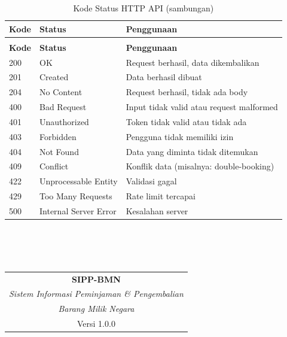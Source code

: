 \documentclass[
  12pt,
  a4paper,
  oneside,
  final
]{report}
\begin{document}
\begin{longtable}[!htbp]{p{3cm} p{4cm} p{5.5cm}}
  \caption{Kode Status HTTP API}
  \label{tab:http-status} \\
  \toprule
  \textbf{Kode} & \textbf{Status} & \textbf{Penggunaan} \\
  \midrule
  \endfirsthead
  \caption[]{Kode Status HTTP API (sambungan)} \\
  \toprule
  \textbf{Kode} & \textbf{Status} & \textbf{Penggunaan} \\
  \midrule
  \endhead
  \bottomrule
  \endfoot

  200 & OK           & Request berhasil, data dikembalikan \\
  201 & Created      & Data berhasil dibuat \\
  204 & No Content   & Request berhasil, tidak ada body \\
  400 & Bad Request  & Input tidak valid atau request malformed \\
  401 & Unauthorized & Token tidak valid atau tidak ada \\
  403 & Forbidden    & Pengguna tidak memiliki izin \\
  404 & Not Found    & Data yang diminta tidak ditemukan \\
  409 & Conflict     & Konflik data (misalnya: double-booking) \\
  422 & Unprocessable Entity & Validasi gagal \\
  429 & Too Many Requests & Rate limit tercapai \\
  500 & Internal Server Error & Kesalahan server \\
\end{longtable}

\clearpage
\thispagestyle{empty}
\vspace*{2cm}
\begin{center}
  \HRule\\[0.3cm]
  {\LARGE\textbf{}}\\[0.3cm]
  \HRule\\[1cm]
  \begin{tabular}{c}
    \textbf{SIPP-BMN} \\
    \textit{Sistem Informasi Peminjaman \& Pengembalian} \\
    \textit{Barang Milik Negara} \\
    Versi 1.0.0
  \end{tabular}
\end{center}
\end{document}
